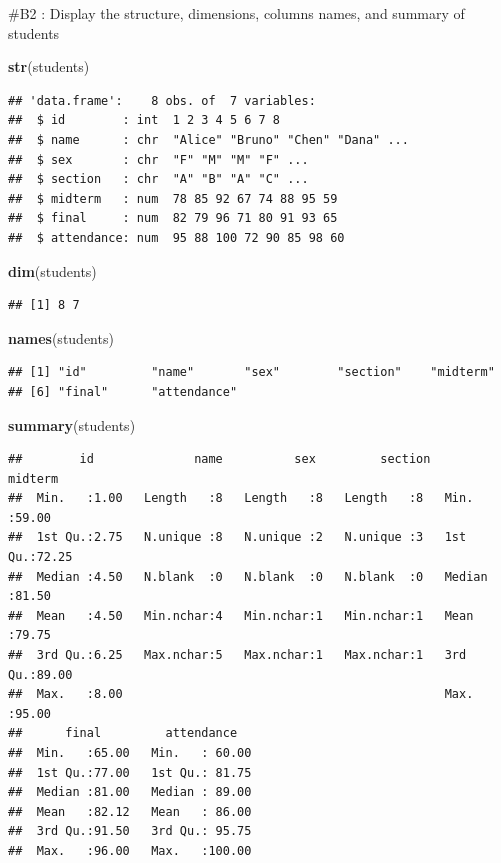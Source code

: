 \documentclass[
]{article}
\newenvironment{Shaded}{\begin{snugshade}}{\end{snugshade}}
\newcommand{\FunctionTok}[1]{\textcolor[rgb]{0.13,0.29,0.53}{\textbf{#1}}}
\newcommand{\NormalTok}[1]{#1}
\begin{document}
\#B2 : Display the structure, dimensions, columns names, and summary of
students

\begin{Shaded}
\begin{Highlighting}[]
\FunctionTok{str}\NormalTok{(students)}
\end{Highlighting}
\end{Shaded}

\begin{verbatim}
## 'data.frame':    8 obs. of  7 variables:
##  $ id        : int  1 2 3 4 5 6 7 8
##  $ name      : chr  "Alice" "Bruno" "Chen" "Dana" ...
##  $ sex       : chr  "F" "M" "M" "F" ...
##  $ section   : chr  "A" "B" "A" "C" ...
##  $ midterm   : num  78 85 92 67 74 88 95 59
##  $ final     : num  82 79 96 71 80 91 93 65
##  $ attendance: num  95 88 100 72 90 85 98 60
\end{verbatim}

\begin{Shaded}
\begin{Highlighting}[]
\FunctionTok{dim}\NormalTok{(students)}
\end{Highlighting}
\end{Shaded}

\begin{verbatim}
## [1] 8 7
\end{verbatim}

\begin{Shaded}
\begin{Highlighting}[]
\FunctionTok{names}\NormalTok{(students)}
\end{Highlighting}
\end{Shaded}

\begin{verbatim}
## [1] "id"         "name"       "sex"        "section"    "midterm"   
## [6] "final"      "attendance"
\end{verbatim}

\begin{Shaded}
\begin{Highlighting}[]
\FunctionTok{summary}\NormalTok{(students)}
\end{Highlighting}
\end{Shaded}

\begin{verbatim}
##        id              name          sex         section     midterm     
##  Min.   :1.00   Length   :8   Length   :8   Length   :8   Min.   :59.00  
##  1st Qu.:2.75   N.unique :8   N.unique :2   N.unique :3   1st Qu.:72.25  
##  Median :4.50   N.blank  :0   N.blank  :0   N.blank  :0   Median :81.50  
##  Mean   :4.50   Min.nchar:4   Min.nchar:1   Min.nchar:1   Mean   :79.75  
##  3rd Qu.:6.25   Max.nchar:5   Max.nchar:1   Max.nchar:1   3rd Qu.:89.00  
##  Max.   :8.00                                             Max.   :95.00  
##      final         attendance    
##  Min.   :65.00   Min.   : 60.00  
##  1st Qu.:77.00   1st Qu.: 81.75  
##  Median :81.00   Median : 89.00  
##  Mean   :82.12   Mean   : 86.00  
##  3rd Qu.:91.50   3rd Qu.: 95.75  
##  Max.   :96.00   Max.   :100.00
\end{verbatim}
\end{document}
